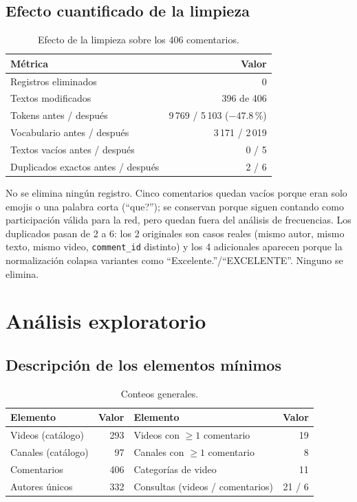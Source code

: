 \documentclass[11pt,a4paper]{article}
\begin{document}
\subsection{Efecto cuantificado de la limpieza}
\begin{table}[H]
\centering
\caption{Efecto de la limpieza sobre los 406 comentarios.}
\begin{tabular}{l r}
\toprule
M\'etrica & Valor \\
\midrule
Registros eliminados & 0 \\
Textos modificados & 396 de 406 \\
Tokens antes / despu\'es & 9\,769 / 5\,103 ($-47.8\,\%$) \\
Vocabulario antes / despu\'es & 3\,171 / 2\,019 \\
Textos vac\'ios antes / despu\'es & 0 / 5 \\
Duplicados exactos antes / despu\'es & 2 / 6 \\
\bottomrule
\end{tabular}
\end{table}
No se elimina ning\'un registro. Cinco comentarios quedan vac\'ios porque eran solo emojis o una
palabra corta (``que?''); se conservan porque siguen contando como participaci\'on v\'alida para la
red, pero quedan fuera del an\'alisis de frecuencias. Los duplicados pasan de 2 a 6: los 2 originales
son casos reales (mismo autor, mismo texto, mismo video, \texttt{comment\_id} distinto) y los 4
adicionales aparecen porque la normalizaci\'on colapsa variantes como ``Excelente.''/``EXCELENTE''.
Ninguno se elimina.

\section{An\'alisis exploratorio}

\subsection{Descripci\'on de los elementos m\'inimos}
\begin{table}[H]
\centering
\caption{Conteos generales.}
\begin{tabular}{l r l r}
\toprule
Elemento & Valor & Elemento & Valor \\
\midrule
Videos (cat\'alogo) & 293 & Videos con $\geq 1$ comentario & 19 \\
Canales (cat\'alogo) & 97 & Canales con $\geq 1$ comentario & 8 \\
Comentarios & 406 & Categor\'ias de video & 11 \\
Autores \'unicos & 332 & Consultas (videos / comentarios) & 21 / 6 \\
\bottomrule
\end{tabular}
\end{table}
\end{document}
